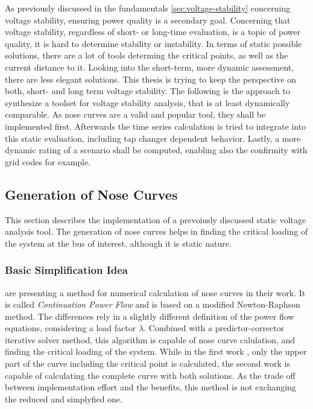 As previously discussed in the fundamentals \autoref{sec:voltage-stability} concerning voltage stability, ensuring power quality is a secondary goal.
Concerning that voltage stability, regardless of short- or long-time evaluation, is a topic of power quality, it is hard to determine stability or instability.
In terms of static possible solutions, there are a lot of tools determing the critical points, as well as the current distance to it.
Looking into the short-term, more dynamic assessment, there are less elegant solutions. 
This thesis is trying to keep the perspective on both, short- and long term voltage stability.
The following is the approach to synthesize a toolset for voltage stability analysis, that is at least dynamically comparable.
As nose curves are a valid and popular tool, they shall be implemented first. 
Afterwards the time series calculation is tried to integrate into this static evaluation, including tap changer dependent behavior.
Lastly, a more dynamic rating of a scenario shall be computed, enabling also the confirmity with grid codes for example.

\subsection{Generation of Nose Curves}
\label{sec:nose-curves}

This section describes the implementation of a prevoiusly discussed static voltage analysis tool.
The generation of nose curves helps in finding the critical loading of the system at the bus of interest, although it is static nature. 

\subsubsection{Basic Simplification Idea}

\textcite{ajjarapu_1992, ajjarapu_2007} are presenting a method for numerical calculation of nose curves in their work. 
It is called {\itshape Continuation Power Flow} and is based on a modified Newton-Raphson method.
The differences rely in a slightly different definition of the power flow equations, considering a load factor $\lambda$.
Combined with a predictor-corrector iterative solver method, this algorithm is capable of nose curve calulation, and finding the critical loading of the system.
While in the first work \autocite{ajjarapu_1992}, only the upper part of the curve including the critical point is calculated, the second work \autocite{ajjarapu_2007} is capable of calculating the complete curve with both solutions. 
As the trade off between implementation effort and the benefits, this method is not exchanging the reduced and simplyfied one.

